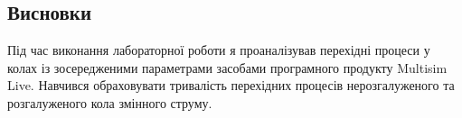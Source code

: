 \documentclass{article}
\begin{document}
\begin{normalsize}
	\section*{Висновки}
	Під час виконання лабораторної роботи я проаналізував перехідні процеси у колах із зосередженими параметрами засобами програмного продукту Multisim Live.
	Навчився обраховувати тривалість перехідних процесів нерозгалуженого та
	розгалуженого кола змінного струму.
	    
\end{normalsize}
\end{document}
